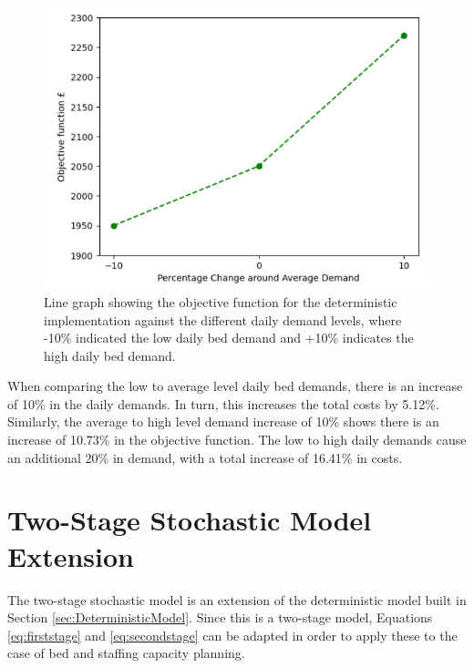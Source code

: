\documentclass[../thesis.tex]{subfiles}
\begin{document}
\begin{figure}[h!]
    \centering
    \includegraphics[scale=0.8]{Chapters/Chapter4/Figures/WorkedExampleUp1.png}
    \caption{Line graph showing the objective function for the deterministic implementation against the different daily demand levels, where -10\% indicated the low daily bed demand and +10\% indicates the high daily bed demand.}
    \label{fig:WEDeterministic}
\end{figure}

When comparing the low to average level daily bed demands, there is an increase of 10\% in the daily demands. In turn, this increases the total costs by 5.12\%. Similarly, the average to high level demand increase of 10\% shows there is an increase of 10.73\% in the objective function. The low to high daily demands cause an additional 20\% in demand, with a total increase of 16.41\% in costs.


\section{Two-Stage Stochastic Model Extension}\label{sec:twostagestochasticmodel}
The two-stage stochastic model is an extension of the deterministic model built in Section \ref{sec:DeterministicModel}. Since this is a two-stage model, Equations \eqref{eq:firststage} and \eqref{eq:secondstage} can be adapted in order to apply these to the case of bed and staffing capacity planning.
\end{document}
